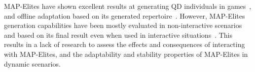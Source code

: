 


MAP-Elites have shown excellent results at generating QD individuals in games~, and offline adaptation based on its generated repertoire~. However, MAP-Elites generation capabilities have been mostly evaluated in non-interactive scenarios and based on its final result even when used in interactive situations~. This results in a lack of research to assess the effects and consequences of interacting with MAP-Elites, and the adaptability and stability properties of MAP-Elites in dynamic scenarios. 

